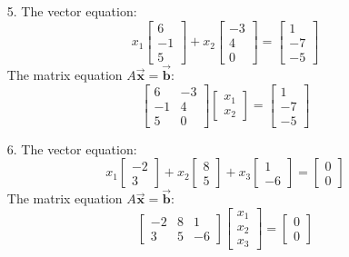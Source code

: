 \documentclass[12pt]{article}
\newcommand{\vect}[1]{\Vec{\textbf{#1}}}
\theoremstyle{definition}
\begin{document}
{\color{red}

\begin{enumerate}
    \item[5.] 
    The vector equation:
    \[
    x_1 \begin{bmatrix} 6 \\ -1 \\ 5 \end{bmatrix} + x_2 \begin{bmatrix} -3 \\ 4 \\ 0 \end{bmatrix} = \begin{bmatrix} 1 \\ -7 \\ -5 \end{bmatrix}
    \]
    The matrix equation $A \vect{x} = \vect{b}$:
    \[
    \begin{bmatrix} 
    6 & -3 \\
    -1 & 4 \\
    5 & 0 
    \end{bmatrix}
    \begin{bmatrix} 
    x_1 \\ x_2 
    \end{bmatrix} = 
    \begin{bmatrix} 
    1 \\ -7 \\ -5 
    \end{bmatrix}
    \]
    
    \item[6.] 
    The vector equation:
    \[
    x_1 \begin{bmatrix} -2 \\ 3 \end{bmatrix} + x_2 \begin{bmatrix} 8 \\ 5 \end{bmatrix} + x_3 \begin{bmatrix} 1 \\ -6 \end{bmatrix} = \begin{bmatrix} 0 \\ 0 \end{bmatrix}
    \]
    The matrix equation $A \vect{x} = \vect{b}$:
    \[
    \begin{bmatrix} 
    -2 & 8 & 1 \\
    3 & 5 & -6
    \end{bmatrix}
    \begin{bmatrix} 
    x_1 \\ x_2 \\ x_3
    \end{bmatrix} = 
    \begin{bmatrix} 
    0 \\ 0 
    \end{bmatrix}
    \]
    

\end{enumerate}}
\end{document}
